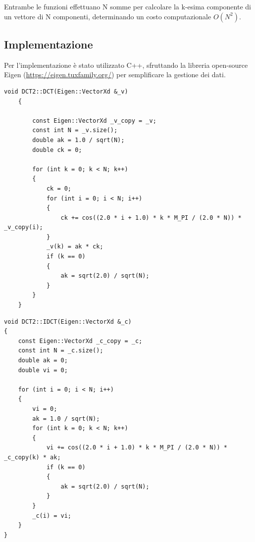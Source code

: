 \documentclass[a4paper,12pt]{report}
\begin{document}
Entrambe le funzioni effettuano N somme per calcolare la k-esima componente di un vettore di N componenti, determinando un costo computazionale \( O(N^2)\).

\subsection*{Implementazione}
Per l'implementazione è stato utilizzato C++, sfruttando la libreria open-source Eigen (\url{https://eigen.tuxfamily.org/}) per semplificare la gestione dei dati.\\
\begin{lstlisting}[caption={Funzione di calcolo DCT},captionpos=b]
	void DCT2::DCT(Eigen::VectorXd &_v)
	{
	
		const Eigen::VectorXd _v_copy = _v;
		const int N = _v.size();
		double ak = 1.0 / sqrt(N);
		double ck = 0;
	
		for (int k = 0; k < N; k++)
		{
			ck = 0;
			for (int i = 0; i < N; i++)
			{
				ck += cos((2.0 * i + 1.0) * k * M_PI / (2.0 * N)) * _v_copy(i);
			}
			_v(k) = ak * ck;
			if (k == 0)
			{
				ak = sqrt(2.0) / sqrt(N);
			}
		}
	}
\end{lstlisting}
\hfill \break
\begin{lstlisting}[caption={Funzione di calcolo IDCT},captionpos=b]
void DCT2::IDCT(Eigen::VectorXd &_c)
{
    const Eigen::VectorXd _c_copy = _c;
    const int N = _c.size();
    double ak = 0;
    double vi = 0;

    for (int i = 0; i < N; i++)
    {
        vi = 0;
        ak = 1.0 / sqrt(N);
        for (int k = 0; k < N; k++)
        {
            vi += cos((2.0 * i + 1.0) * k * M_PI / (2.0 * N)) * _c_copy(k) * ak;
            if (k == 0)
            {
                ak = sqrt(2.0) / sqrt(N);
            }
        }
        _c(i) = vi;
    }
}
\end{lstlisting}
\end{document}
